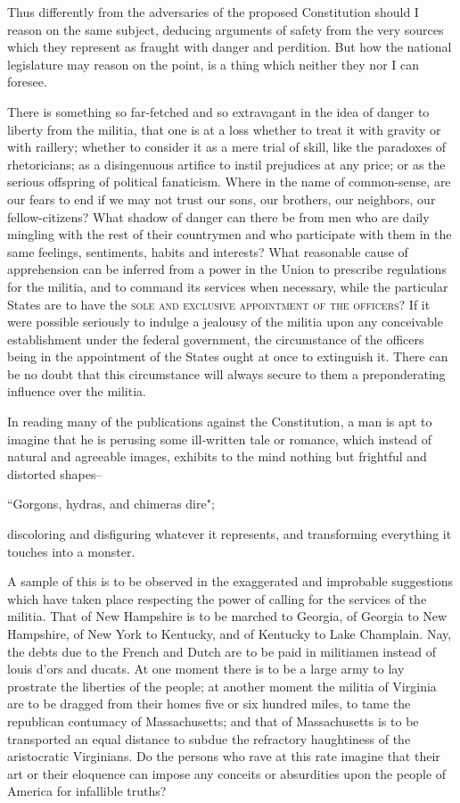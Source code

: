 Thus differently from the adversaries of the proposed Constitution should I reason on the same subject, deducing arguments of safety from the very sources which they represent as fraught with danger and perdition. But how the national legislature may reason on the point, is a thing which neither they nor I can foresee.

There is something so far-fetched and so extravagant in the idea of danger to liberty from the militia, that one is at a loss whether to treat it with gravity or with raillery; whether to consider it as a mere trial of skill, like the paradoxes of rhetoricians; as a disingenuous artifice to instil prejudices at any price; or as the serious offspring of political fanaticism. Where in the name of common-sense, are our fears to end if we may not trust our sons, our brothers, our neighbors, our fellow-citizens? What shadow of danger can there be from men who are daily mingling with the rest of their countrymen and who participate with them in the same feelings, sentiments, habits and interests? What reasonable cause of apprehension can be inferred from a power in the Union to prescribe regulations for the militia, and to command its services when necessary, while the particular States are to have the \textsc{sole and exclusive appointment of the officers}? If it were possible seriously to indulge a jealousy of the militia upon any conceivable establishment under the federal government, the circumstance of the officers being in the appointment of the States ought at once to extinguish it. There can be no doubt that this circumstance will always secure to them a preponderating influence over the militia.

In reading many of the publications against the Constitution, a man is apt to imagine that he is perusing some ill-written tale or romance, which instead of natural and agreeable images, exhibits to the mind nothing but frightful and distorted shapes--

                ``Gorgons, hydras, and chimeras dire";

discoloring and disfiguring whatever it represents, and transforming everything it touches into a monster.

A sample of this is to be observed in the exaggerated and improbable suggestions which have taken place respecting the power of calling for the services of the militia. That of New Hampshire is to be marched to Georgia, of Georgia to New Hampshire, of New York to Kentucky, and of Kentucky to Lake Champlain. Nay, the debts due to the French and Dutch are to be paid in militiamen instead of louis d'ors and ducats. At one moment there is to be a large army to lay prostrate the liberties of the people; at another moment the militia of Virginia are to be dragged from their homes five or six hundred miles, to tame the republican contumacy of Massachusetts; and that of Massachusetts is to be transported an equal distance to subdue the refractory haughtiness of the aristocratic Virginians. Do the persons who rave at this rate imagine that their art or their eloquence can impose any conceits or absurdities upon the people of America for infallible truths?

